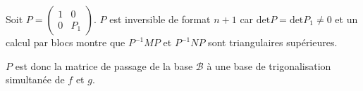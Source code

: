 {{Soit $P=\left(
\begin{array}{cc}
1&0\\
0&P_1
\end{array}
\right)$. $P$ est inversible de format $n+1$ car $\text{det}P =\text{det}P_1\neq0$ et un calcul par blocs montre que $P^{-1}MP$ et $P^{-1}NP$ sont triangulaires supérieures.

$P$ est donc la matrice de passage de la base $\mathcal{B}$ à une base de trigonalisation simultanée de $f$ et $g$.
}
}
